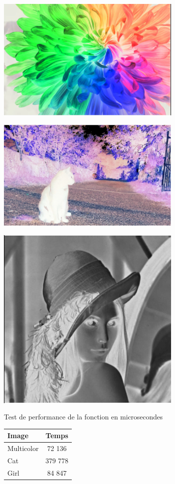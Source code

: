 \documentclass{article}
\begin{document}
\begin{center} 
    \includegraphics[width=9cm]{../Image_fonctions/Multicolor/Negative.PNG}
\end{center}
\begin{center} 
    \includegraphics[width=9cm]{../Image_fonctions/Cat/Negative.PNG}
\end{center}
\begin{center} 
    \includegraphics[width=9cm]{../Image_fonctions/Lenna/Negative.PNG}
\end{center}

\begin{center}
\medbreak
Test de performance de la fonction en microsecondes
\bigbreak
   \begin{tabular}{ | l | c | }
     \hline
     Image & Temps \\
     \hline
     Multicolor & 72 136 \\
     \hline
     Cat & 379 778 \\
     \hline
     Girl & 84 847 \\
     \hline
   \end{tabular}
 \end{center}
\bigbreak
\end{document}
